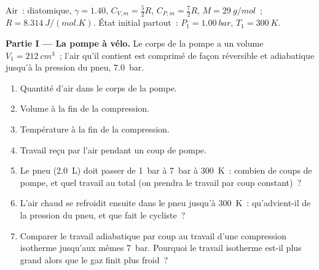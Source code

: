 \begin{problem}
\label{pb:b1:first-law:1}
Air~:  diatomique, $\gamma = 1.40$, $C_{V,m} = \tfrac52 R$, $C_{P,m} =
\tfrac72 R$, $M = \qty{29}{g/mol}$~; $R = \qty{8.314}{J/(mol.K)}$. État initial
partout~: $P_1 = \qty{1.00}{bar}$, $T_1 = \qty{300}{K}$.

\medskip
\noindent\textbf{Partie I --- La pompe à vélo.}
Le corps de la pompe a un volume $V_1 = \qty{212}{cm^3}$~; l'air qu'il
contient est comprimé de façon réversible et adiabatique jusqu'à la pression
du pneu, \qty{7.0}{bar}.
\begin{enumerate}
  \item Quantité d'air dans le corps de la pompe.
  \item Volume à la fin de la compression.
  \item Température à la fin de la compression.
  \item Travail reçu par l'air pendant un coup de pompe.
  \item Le pneu (\qty{2.0}{L}) doit passer de \qty{1}{bar} à \qty{7}{bar}
        à \qty{300}{K}~: combien de coups de pompe, et quel travail au
        total (on prendra le travail par coup constant)~?
  \item L'air chaud se refroidit ensuite dans le pneu jusqu'à \qty{300}{K}~:
        qu'advient-il de la pression du pneu, et que fait le cycliste~?
  \item Comparer le travail adiabatique par coup au travail d'une
        compression isotherme jusqu'aux mêmes \qty{7}{bar}. Pourquoi le
        travail isotherme est-il plus grand alors que le gaz finit plus froid~?
\end{enumerate}


\end{problem}
